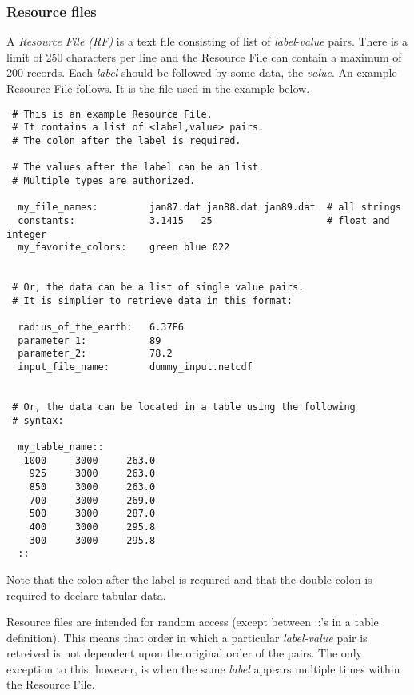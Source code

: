 
 \subsubsection{Resource files}

   A {\em Resource File (RF)} is a text file consisting of list of 
   {\em label}-{\em value} pairs. There is a limit of 250 characters 
   per line and the Resource File can contain a maximum of 200 records. 
   Each {\em label} should be followed by some data, the {\em value}. 
   An example Resource File follows.  It is the file used in the example 
   below. 

 \begin{verbatim}
 # This is an example Resource File.  
 # It contains a list of <label,value> pairs.
 # The colon after the label is required. 

 # The values after the label can be an list.
 # Multiple types are authorized.
  
  my_file_names:         jan87.dat jan88.dat jan89.dat  # all strings
  constants:             3.1415   25                    # float and integer
  my_favorite_colors:    green blue 022               


 # Or, the data can be a list of single value pairs. 
 # It is simplier to retrieve data in this format:

  radius_of_the_earth:   6.37E6         
  parameter_1:           89
  parameter_2:           78.2
  input_file_name:       dummy_input.netcdf 


 # Or, the data can be located in a table using the following
 # syntax:

  my_table_name::
   1000     3000     263.0
    925     3000     263.0
    850     3000     263.0
    700     3000     269.0
    500     3000     287.0
    400     3000     295.8
    300     3000     295.8
  ::
 \end{verbatim}

 Note that the colon after the label is required and that the double colon is required
 to declare tabular data. 

 Resource files are intended for random access (except between ::'s in a 
 table definition). This means that order in which a particular 
 {\em label-value} pair is retreived is not dependent upon the original order 
 of the pairs. The only exception to this, however, is when the same {\em label} appears 
 multiple times within the Resource File.




